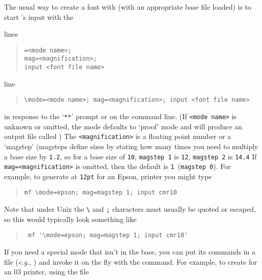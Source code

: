 The usual way to create a font with \MF{} (with an appropriate base
file loaded) is to start \MF{}'s input with the
\begin{narrowversion}
  lines
  \begin{quote}
    \texttt{=<mode name>;}\\
    \texttt{mag=<magnification>;}\\
    \texttt{input <font file name>}
  \end{quote}
\end{narrowversion}
\begin{wideversion}
line
\begin{quote}
\begin{verbatim}
\mode=<mode name>; mag=<magnification>; input <font file name>
\end{verbatim}
\end{quote}
\end{wideversion}
in response to the `\texttt{**}' prompt or on the \MF{} command line. (If
\texttt{<mode name>} is unknown or omitted, the mode defaults to
`proof' mode and \MF{} will produce an output file called %
)
The \texttt{<magnification>} is a floating point number or a
`magstep' (magsteps define sizes by stating how many times you need to
multiply a base size by \texttt{1.2}, so for a base size of
\texttt{10}, \texttt{magstep 1} is \texttt{12}, \texttt{magstep 2} is
\texttt{14.4}
If \texttt{mag=<magnification>} is omitted, then the default
is \texttt{1}~(\texttt{magstep 0}).  For example, to generate
 at \texttt{12pt} for an Epson,
printer you might type
\begin{quote}
\begin{verbatim}
mf \mode=epson; mag=magstep 1; input cmr10
\end{verbatim}
\end{quote}
Note that under Unix the \texttt{\textbackslash } and \texttt{;}
characters must usually be quoted or escaped, so this would typically
look something like
\begin{quote}
\begin{verbatim}
 mf '\mode=epson; mag=magstep 1; input cmr10'
\end{verbatim}
\end{quote}
If you need a special mode that isn't in the base, you can put its
commands in a file (\emph{e.g.}, ) and invoke it on the
fly with the  command.  For example, to create
 for an 03 printer, using the file
